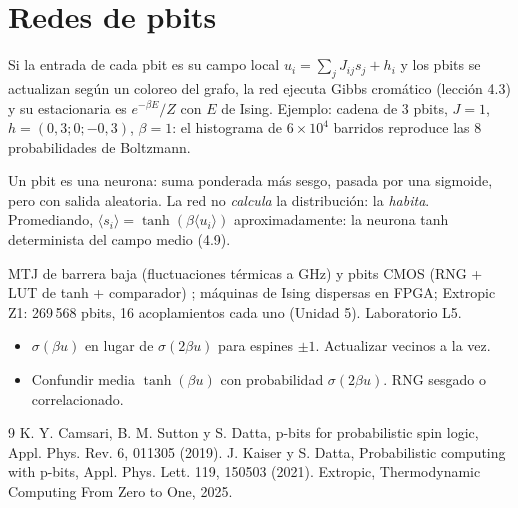 \documentclass[11pt,a4paper]{article}
\begin{document}
\section{Redes de pbits}
Si la entrada de cada pbit es su campo local $u_i=\sum_jJ_{ij}s_j+h_i$ y los pbits se actualizan según un coloreo del grafo, la red ejecuta Gibbs
cromático (lección 4.3) y su estacionaria es $e^{-\beta E}/Z$ con $E$ de Ising. Ejemplo: cadena de 3 pbits, $J=1$, $h=(0{,}3;0;-0{,}3)$, $\beta=1$:
el histograma de $6\times10^4$ barridos reproduce las 8 probabilidades de Boltzmann.
\begin{intuicion}
Un pbit es una neurona: suma ponderada más sesgo, pasada por una sigmoide, pero con salida aleatoria. La red no \emph{calcula} la distribución:
la \emph{habita}. Promediando, $\langle s_i\rangle=\tanh(\beta\langle u_i\rangle)$ aproximadamente: la neurona tanh determinista del campo medio (4.9).
\end{intuicion}

\begin{aplicacion}
MTJ de barrera baja (fluctuaciones térmicas a GHz) y pbits CMOS (RNG + LUT de tanh + comparador) \cite{camsari,kaiser}; máquinas de Ising dispersas
en FPGA; Extropic Z1: 269\,568 pbits, 16 acoplamientos cada uno (Unidad 5). Laboratorio L5.
\end{aplicacion}

\begin{error}
\begin{itemize}[nosep]
\item $\sigma(\beta u)$ en lugar de $\sigma(2\beta u)$ para espines $\pm1$. \quad Actualizar vecinos a la vez.
\item Confundir media $\tanh(\beta u)$ con probabilidad $\sigma(2\beta u)$. \quad RNG sesgado o correlacionado.
\end{itemize}
\end{error}

\begin{thebibliography}{9}\small
{} K. Y. Camsari, B. M. Sutton y S. Datta, p-bits for probabilistic spin logic, Appl. Phys. Rev. 6, 011305 (2019).
 J. Kaiser y S. Datta, Probabilistic computing with p-bits, Appl. Phys. Lett. 119, 150503 (2021).
 Extropic, Thermodynamic Computing From Zero to One, 2025.
\end{thebibliography}
\end{document}
